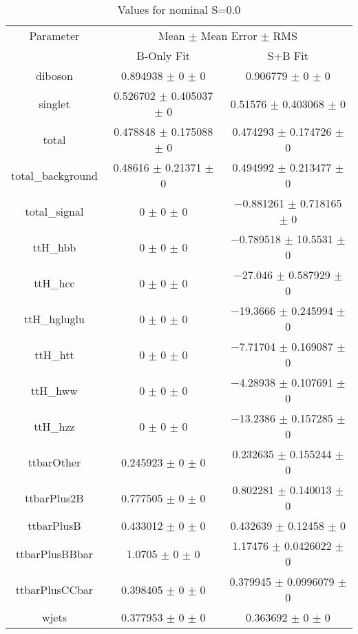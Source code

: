 \begin{table}
\centering
\caption{Values for nominal S=0.0}
\begin{tabular}{ccc}
\toprule
Parameter & \multicolumn{2}{c}{Mean $\pm$ Mean Error $\pm$ RMS}\\
 & B-Only Fit & S+B Fit\\
\midrule
diboson & \num{0.894938} $\pm$ \num{0} $\pm$ \num{0} & \num{0.906779} $\pm$ \num{0} $\pm$ \num{0}\\
singlet & \num{0.526702} $\pm$ \num{0.405037} $\pm$ \num{0} & \num{0.51576} $\pm$ \num{0.403068} $\pm$ \num{0}\\
total & \num{0.478848} $\pm$ \num{0.175088} $\pm$ \num{0} & \num{0.474293} $\pm$ \num{0.174726} $\pm$ \num{0}\\
total\_background & \num{0.48616} $\pm$ \num{0.21371} $\pm$ \num{0} & \num{0.494992} $\pm$ \num{0.213477} $\pm$ \num{0}\\
total\_signal & \num{0} $\pm$ \num{0} $\pm$ \num{0} & \num{-0.881261} $\pm$ \num{0.718165} $\pm$ \num{0}\\
ttH\_hbb & \num{0} $\pm$ \num{0} $\pm$ \num{0} & \num{-0.789518} $\pm$ \num{10.5531} $\pm$ \num{0}\\
ttH\_hcc & \num{0} $\pm$ \num{0} $\pm$ \num{0} & \num{-27.046} $\pm$ \num{0.587929} $\pm$ \num{0}\\
ttH\_hgluglu & \num{0} $\pm$ \num{0} $\pm$ \num{0} & \num{-19.3666} $\pm$ \num{0.245994} $\pm$ \num{0}\\
ttH\_htt & \num{0} $\pm$ \num{0} $\pm$ \num{0} & \num{-7.71704} $\pm$ \num{0.169087} $\pm$ \num{0}\\
ttH\_hww & \num{0} $\pm$ \num{0} $\pm$ \num{0} & \num{-4.28938} $\pm$ \num{0.107691} $\pm$ \num{0}\\
ttH\_hzz & \num{0} $\pm$ \num{0} $\pm$ \num{0} & \num{-13.2386} $\pm$ \num{0.157285} $\pm$ \num{0}\\
ttbarOther & \num{0.245923} $\pm$ \num{0} $\pm$ \num{0} & \num{0.232635} $\pm$ \num{0.155244} $\pm$ \num{0}\\
ttbarPlus2B & \num{0.777505} $\pm$ \num{0} $\pm$ \num{0} & \num{0.802281} $\pm$ \num{0.140013} $\pm$ \num{0}\\
ttbarPlusB & \num{0.433012} $\pm$ \num{0} $\pm$ \num{0} & \num{0.432639} $\pm$ \num{0.12458} $\pm$ \num{0}\\
ttbarPlusBBbar & \num{1.0705} $\pm$ \num{0} $\pm$ \num{0} & \num{1.17476} $\pm$ \num{0.0426022} $\pm$ \num{0}\\
ttbarPlusCCbar & \num{0.398405} $\pm$ \num{0} $\pm$ \num{0} & \num{0.379945} $\pm$ \num{0.0996079} $\pm$ \num{0}\\
wjets & \num{0.377953} $\pm$ \num{0} $\pm$ \num{0} & \num{0.363692} $\pm$ \num{0} $\pm$ \num{0}\\
\bottomrule
\end{tabular}
\end{table}
